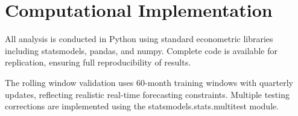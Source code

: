 \documentclass[12pt]{article}
\begin{document}
\section{Computational Implementation}

All analysis is conducted in Python using standard econometric libraries including statsmodels, pandas, and numpy. Complete code is available for replication, ensuring full reproducibility of results.

The rolling window validation uses 60-month training windows with quarterly updates, reflecting realistic real-time forecasting constraints. Multiple testing corrections are implemented using the statsmodels.stats.multitest module.
\end{document}
